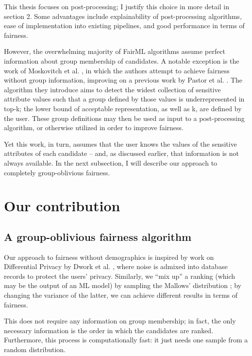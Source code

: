 This thesis focuses on post-processing; I justify this choice in more detail in section 2. Some advantages include explainability of post-processing algorithms, ease of implementation into existing pipelines, and good performance in terms of fairness.

However, the overwhelming majority of FairML algorithms assume perfect information about group membership of candidates. A notable exception is the work of Moskovitch et al. \cite{detectionofgroups}, in which the authors attempt to achieve fairness without group information, improving on a previous work by Pastor et al. \cite{https://arxiv.org/abs/2108.07450}. The algorithm they introduce aims to detect the widest collection of sensitive attribute values such that a group defined by those values is underrepresented in top-k; the lower bound of acceptable representation, as well as k, are defined by the user. These group definitions may then be used as input to a post-processing algorithm, or otherwise utilized in order to improve fairness.

Yet this work, in turn, assumes that the user knows the values of the sensitive attributes of each candidate – and, as discussed earlier, that information is not always available. In the next subsection, I will describe our approach to completely group-oblivious fairness.

\section{Our contribution}\label{sect:int_4}

\subsection{A group-oblivious fairness algorithm}

Our approach to fairness without demographics is inspired by work on Differential Privacy by Dwork et al. \cite{foundationsofDPDwork}, where noise is admixed into database records to protect the users’ privacy. Similarly, we “mix up” a ranking (which may be the output of an ML model) by sampling the Mallows’ distribution \cite{mallows}; by changing the variance of the latter, we can achieve different results in terms of fairness.

This does not require any information on group membership; in fact, the only necessary information is the order in which the candidates are ranked. Furthermore, this process is computationally fast: it just needs one sample from a random distribution.

